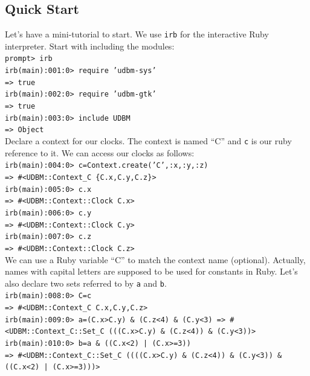 \documentclass[a4paper]{report}
\begin{document}
\subsection{Quick Start}
\label{QUICK}
Let's have a mini-tutorial to start. We use {\tt irb} for the
interactive Ruby interpreter. Start with including the modules:\\
\newline
{\tt prompt> irb\\
irb(main):001:0> require 'udbm-sys'\\
=> true\\
irb(main):002:0> require 'udbm-gtk'\\
=> true\\
irb(main):003:0> include UDBM\\
=> Object}\\
\newline
Declare a context for our clocks. The context is named ``C'' and {\tt c}
is our ruby reference to it. We can access our clocks as follows:\\
\newline
{\tt  irb(main):004:0> c=Context.create('C',:x,:y,:z)\\
=> \#<UDBM::Context\_C \{C.x,C.y,C.z\}>\\
irb(main):005:0> c.x\\
=> \#<UDBM::Context::Clock C.x>\\
irb(main):006:0> c.y\\
=> \#<UDBM::Context::Clock C.y>\\
irb(main):007:0> c.z\\
=> \#<UDBM::Context::Clock C.z>}\\
\newline
We can use a Ruby variable ``C'' to match the context name
(optional). Actually, names with capital letters are supposed to be
used for constants in Ruby. Let's also declare two sets referred to by
{\tt a} and {\tt b}.\\
\newline
{\tt irb(main):008:0> C=c\\
=> \#<UDBM::Context\_C {C.x,C.y,C.z}>\\
irb(main):009:0> a=(C.x>C.y) \& (C.z<4) \& (C.y<3)
=> \#<UDBM::Context\_C::Set\_C (((C.x>C.y) \& (C.z<4)) \& (C.y<3))>\\
irb(main):010:0> b=a \& ((C.x<2) | (C.x>=3))\\
=> \#<UDBM::Context\_C::Set\_C ((((C.x>C.y) \& (C.z<4)) \& (C.y<3)) \&
((C.x<2) | (C.x>=3)))>}\\
\end{document}

